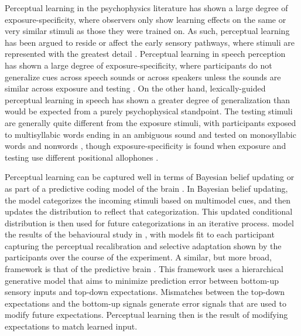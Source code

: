 Perceptual learning in the psychophysics literature has shown a large degree of exposure-specificity, where observers only show learning effects on the same or very similar stimuli as those they were trained on. As such, perceptual learning has been argued to reside or affect the early sensory pathways, where stimuli are represented with the greatest detail \citep{Gilbert2001}.  Perceptual learning in speech perception has shown a large degree of exposure-specificity, where participants do not generalize cues across speech sounds \citep{Reinisch2014} or across speakers unless the sounds are similar across exposure and testing \citep{Eisner2005, Kraljic2005, Kraljic2007, Reinisch2013a}.  On the other hand, lexically-guided perceptual learning in speech has shown a greater degree of generalization than would be expected from a purely psychophysical standpoint.  The testing stimuli are generally quite different from the exposure stimuli, with participants exposed to multisyllabic words ending in an ambiguous sound and tested on monosyllabic words \citep{Reinisch2013} and nonwords \citep{Norris2003, Kraljic2005}, though exposure-specificity is found when exposure and testing use different positional allophones \citep{Mitterer2013}.








Perceptual learning can be captured well in terms of Bayesian belief updating \citep{Kleinschmidt2011} or as part of a predictive coding model of the brain \citep{Clark2013}.  
In Bayesian belief updating, the model categorizes the incoming stimuli based on multimodel cues, and then updates the distribution to reflect that categorization.  
This updated conditional distribution is then used for future categorizations in an iterative process.  
\citet{Kleinschmidt2011} model the results of the behavioural study in \citet{Vroomen2007}, with models fit to each participant capturing the perceptual recalibration and selective adaptation shown by the participants over the course of the experiment.  
A similar, but more broad, framework is that of the predictive brain \citep{Clark2013}. 
This framework uses a hierarchical generative model that aims to minimize prediction error between bottom-up sensory inputs and top-down expectations.  
Mismatches between the top-down expectations and the bottom-up signals generate error signals that are used to modify future expectations.  
Perceptual learning then is the result of modifying expectations to match learned input.

